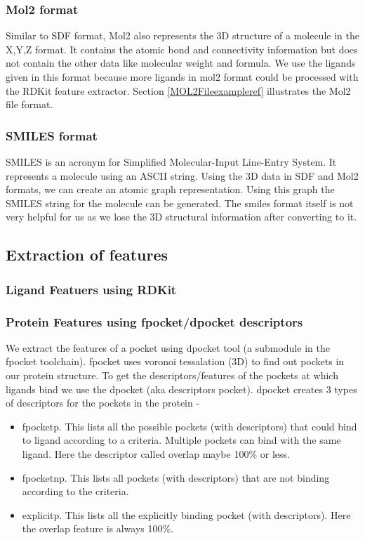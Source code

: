 \documentclass[11pt]{article}
\begin{document}
\subsubsection{Mol2 format}
Similar to SDF format,  Mol2 also represents the 3D structure of a molecule in the X,Y,Z format.
It contains the atomic bond and connectivity information but does not contain the other data like molecular weight and formula.
We use the ligands given in this format because more ligands in mol2 format could be processed with the RDKit feature extractor.
Section \ref{MOL2Fileexampleref} illustrates the Mol2 file format.

\subsubsection{SMILES format}
SMILES is an acronym for Simplified Molecular-Input Line-Entry System.
It represents a molecule using an ASCII string.
Using the 3D data in SDF and Mol2 formats,  we can create an atomic graph representation.
Using this graph the SMILES string for the molecule can be generated.
The smiles format itself is not very helpful for us as we lose the 3D structural information after converting to it.
\cite{smilesformat}

\subsection{Extraction of features}
\subsubsection{Ligand Featuers using RDKit}
\subsubsection{Protein Features using fpocket/dpocket descriptors}
We extract the features of a pocket using dpocket tool (a submodule in the fpocket toolchain).
fpocket uses voronoi tessalation (3D) to find out pockets in our protein structure.
To get the descriptors/features of the pockets at which ligands bind we use the dpocket (aka descriptors pocket).
dpocket creates 3 types of descriptors for the pockets in the protein -
\begin{itemize}
\item fpocketp.  This lists all the possible pockets (with descriptors) that could bind to ligand according to a criteria.
Multiple pockets can bind with the same ligand.
Here the descriptor called overlap maybe 100\% or less.
\item fpocketnp.  This lists all pockets (with descriptors) that are not binding according to the criteria.
\item explicitp.
This lists all the explicitly binding pocket (with descriptors).
Here the overlap feature is always 100\%.
\end{itemize}
\end{document}
